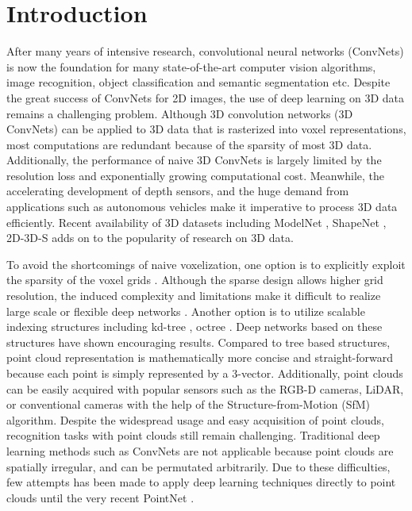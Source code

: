 \documentclass[10pt,twocolumn,letterpaper]{article}
\begin{document}
\section{Introduction} \label{sec_intro}
After many years of intensive research, convolutional neural networks (ConvNets) is now the foundation for many state-of-the-art computer vision algorithms, \eg image recognition, object classification and semantic segmentation etc. Despite the great success of ConvNets for 2D images, the use of deep learning on 3D data remains a challenging problem. Although 3D convolution networks (3D ConvNets) can be applied to 3D data that is rasterized into voxel representations, most computations are redundant because of the sparsity of most 3D data. Additionally, the performance of naive 3D ConvNets is largely limited by the resolution loss and exponentially growing computational cost. Meanwhile, the accelerating development of depth sensors, and the huge demand from applications such as autonomous vehicles make it imperative to process 3D data efficiently. Recent availability of 3D datasets including ModelNet \cite{wu20153d}, ShapeNet \cite{chang2015shapenet}, 2D-3D-S \cite{2017arXiv170201105A} adds on to the popularity of research on 3D data. 

To avoid the shortcomings of naive voxelization, one option is to explicitly exploit the sparsity of the voxel grids \cite{wang2015voting, li2016fpnn, engelcke2017vote3deep}. Although the sparse design allows higher grid resolution, the induced complexity and limitations make it difficult to realize large scale or flexible deep networks \cite{Riegler2017OctNet}. Another option is to utilize scalable indexing structures including kd-tree \cite{bentley1975multidimensional}, octree \cite{meagher1980octree}. Deep networks based on these structures have shown encouraging results. Compared to tree based structures, point cloud representation is mathematically more concise and straight-forward because each point is simply represented by a 3-vector. Additionally, point clouds can be easily acquired with popular sensors such as the RGB-D cameras, LiDAR, or conventional cameras with the help of the Structure-from-Motion (SfM) algorithm. Despite the widespread usage and easy acquisition of point clouds, recognition tasks with point clouds still remain challenging. Traditional deep learning methods such as ConvNets are not applicable because point clouds are spatially irregular, and can be permutated arbitrarily. Due to these difficulties, few attempts has been made to apply deep learning techniques directly to point clouds until the very recent PointNet \cite{qi2016pointnet}. 
\end{document}
